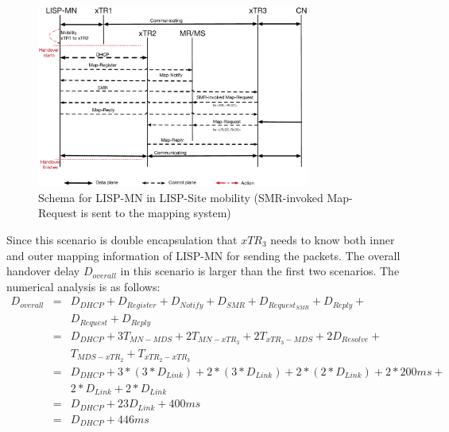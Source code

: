 \begin{figure}[!th]
	\centering
	\includegraphics[width=0.8\textwidth]{Pics/Mobility_double_encap_schema_SMR_askMDS_simplify}
	\caption{Schema for LISP-MN in LISP-Site mobility (SMR-invoked Map-Request is sent to the mapping system)}
	\label{Mobility_double_encap_schema_SMR_askMDS_simplify}
\end{figure}

Since this scenario is double encapsulation that $xTR_3$ needs to know both inner and outer mapping information of LISP-MN for sending the packets. The overall handover delay $D_{overall}$ in this scenario is larger than the first two scenarios. The numerical analysis is as follows:
\begin{eqnarray}
D_{overall} &=& D_{DHCP} + D_{Register} + D_{Notify} + D_{SMR} + D_{Request_{SMR}} + D_{Reply} +  \nonumber \\
& & D_{Request}+ D_{Reply} \nonumber \\
&=& D_{DHCP} + 3T_{MN-MDS} + 2T_{MN-xTR_3} + 2T_{xTR_3-MDS} + 2D_{Resolve} +   \nonumber \\
& & T_{MDS-xTR_2} + T_{xTR_2-xTR_3}   \nonumber \\
&=& D_{DHCP} + 3* (3*D_{Link}) + 2*(3*D_{Link}) + 2*(2*D_{Link}) + 2*200ms +  \nonumber \\
& & 2*D_{Link} + 2*D_{Link} \nonumber \\
&=& D_{DHCP} + 23D_{Link} + 400 ms  \\
&=& D_{DHCP} + 446 ms \nonumber
\end{eqnarray}

